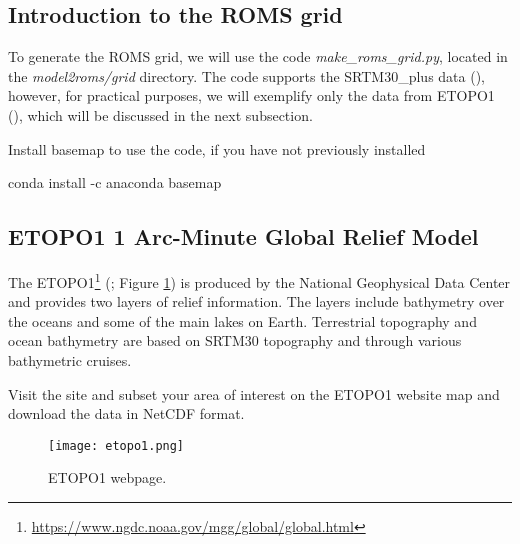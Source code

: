 \subsection{Introduction to the ROMS grid}
\bigskip

\noindent To generate the ROMS grid, we will use the code \textit{make\_roms\_grid.py}, located in the \textit{model2roms/grid} 
directory. The code supports the SRTM30\_plus data (\cite{Becker2009}), however, for practical purposes, we will exemplify 
only the data from ETOPO1 (\cite{Amante2009}), which will be discussed in the next subsection.
\bigskip

\noindent Install basemap to use the code, if you have not previously installed
\bigskip

\begin{bashcode}
conda install -c anaconda basemap
\end{bashcode}
\bigskip

\subsection{ETOPO1 1 Arc-Minute Global Relief Model}
\bigskip

\noindent The ETOPO1\textcolor{bleu_cite}{\textit{}\footnote{\textcolor{bleu_cite}{\href{https://www.ngdc.noaa.gov/mgg/global/global.html}{https://www.ngdc.noaa.gov/mgg/global/global.html}}}}
 (\cite{Amante2009}; Figure \textcolor{bleu_cite}{\ref{etopo1}}) 
is produced by the National Geophysical Data Center and provides two layers of relief information.
The layers include bathymetry over the oceans and some of the main lakes on Earth.
 Terrestrial topography and ocean bathymetry are based on SRTM30 topography and through various bathymetric cruises.
\bigskip

\noindent Visit the site
and subset your area of interest on the ETOPO1 website map and download the data in NetCDF format.

\bigskip  
   
\begin{figure}[H]
    \centering
    \texttt{[image: etopo1.png]}
    \caption{ETOPO1 webpage.}
    \label{etopo1}
\end{figure}
\bigskip


\bigskip

